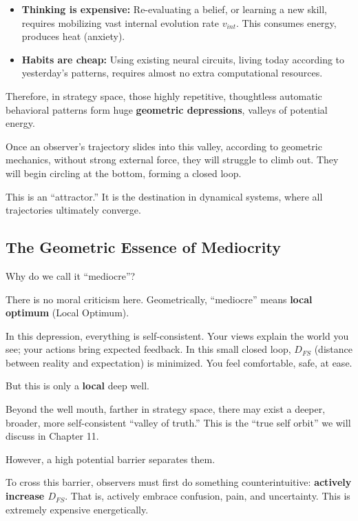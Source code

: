 \begin{itemize}
\item \textbf{Thinking is expensive:} Re-evaluating a belief, or learning a new skill, requires mobilizing vast internal evolution rate $v_{int}$. This consumes energy, produces heat (anxiety).

\item \textbf{Habits are cheap:} Using existing neural circuits, living today according to yesterday's patterns, requires almost no extra computational resources.
\end{itemize}

Therefore, in strategy space, those highly repetitive, thoughtless automatic behavioral patterns form huge \textbf{geometric depressions}, valleys of potential energy.

Once an observer's trajectory slides into this valley, according to geometric mechanics, without strong external force, they will struggle to climb out. They will begin circling at the bottom, forming a closed loop.

This is an ``attractor.'' It is the destination in dynamical systems, where all trajectories ultimately converge.

\subsection{The Geometric Essence of Mediocrity}

Why do we call it ``mediocre''?

There is no moral criticism here. Geometrically, ``mediocre'' means \textbf{local optimum} (Local Optimum).

In this depression, everything is self-consistent. Your views explain the world you see; your actions bring expected feedback. In this small closed loop, $D_{FS}$ (distance between reality and expectation) is minimized. You feel comfortable, safe, at ease.

But this is only a \textbf{local} deep well.

Beyond the well mouth, farther in strategy space, there may exist a deeper, broader, more self-consistent ``valley of truth.'' This is the ``true self orbit'' we will discuss in Chapter 11.

However, a high potential barrier separates them.

To cross this barrier, observers must first do something counterintuitive: \textbf{actively increase $D_{FS}$}. That is, actively embrace confusion, pain, and uncertainty. This is extremely expensive energetically.

